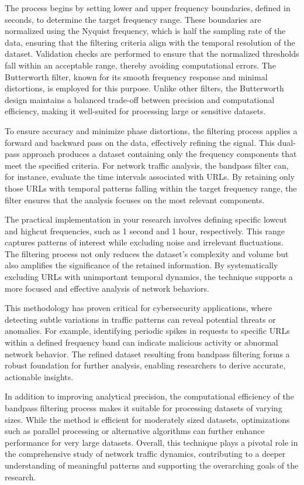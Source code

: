 The process begins by setting lower and upper frequency boundaries, defined in seconds, to determine the target frequency range. These boundaries are normalized using the Nyquist frequency, which is half the sampling rate of the data, ensuring that the filtering criteria align with the temporal resolution of the dataset. Validation checks are performed to ensure that the normalized thresholds fall within an acceptable range, thereby avoiding computational errors. The Butterworth filter, known for its smooth frequency response and minimal distortions, is employed for this purpose. Unlike other filters, the Butterworth design maintains a balanced trade-off between precision and computational efficiency, making it well-suited for processing large or sensitive datasets.

To ensure accuracy and minimize phase distortions, the filtering process applies a forward and backward pass on the data, effectively refining the signal. This dual-pass approach produces a dataset containing only the frequency components that meet the specified criteria. For network traffic analysis, the bandpass filter can, for instance, evaluate the time intervals associated with URLs. By retaining only those URLs with temporal patterns falling within the target frequency range, the filter ensures that the analysis focuses on the most relevant components.

The practical implementation in your research involves defining specific lowcut and highcut frequencies, such as 1 second and 1 hour, respectively. This range captures patterns of interest while excluding noise and irrelevant fluctuations. The filtering process not only reduces the dataset's complexity and volume but also amplifies the significance of the retained information. By systematically excluding URLs with unimportant temporal dynamics, the technique supports a more focused and effective analysis of network behaviors.

This methodology has proven critical for cybersecurity applications, where detecting subtle variations in traffic patterns can reveal potential threats or anomalies. For example, identifying periodic spikes in requests to specific URLs within a defined frequency band can indicate malicious activity or abnormal network behavior. The refined dataset resulting from bandpass filtering forms a robust foundation for further analysis, enabling researchers to derive accurate, actionable insights.

In addition to improving analytical precision, the computational efficiency of the bandpass filtering process makes it suitable for processing datasets of varying sizes. While the method is efficient for moderately sized datasets, optimizations such as parallel processing or alternative algorithms can further enhance performance for very large datasets. Overall, this technique plays a pivotal role in the comprehensive study of network traffic dynamics, contributing to a deeper understanding of meaningful patterns and supporting the overarching goals of the research.

